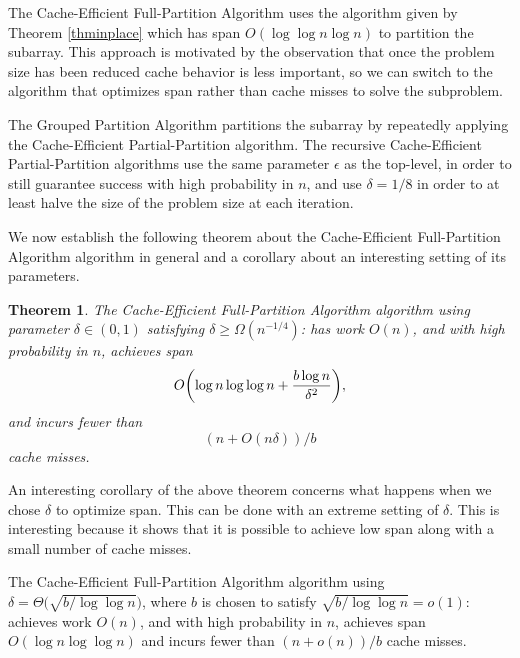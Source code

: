 \documentclass[twocolumn, twoside, 11pt]{article}
\DeclarePairedDelimiter{\paren}{(}{)}
\newtheorem{theorem}{Theorem}
\begin{document}
The Cache-Efficient Full-Partition Algorithm uses the algorithm given by Theorem \ref{thminplace} which has span $O(\log\log n \log n)$ to partition the subarray.
This approach is motivated by the observation that once the problem size has been reduced cache behavior is less important, so we can switch to the algorithm that optimizes span rather than cache misses to solve the subproblem.

The Grouped Partition Algorithm partitions the subarray by repeatedly applying the Cache-Efficient Partial-Partition algorithm. 
The recursive Cache-Efficient Partial-Partition algorithms use the same parameter $\epsilon$ as the top-level, in order to still guarantee success with high probability in $n$, and use $\delta = 1/8$ in order to at least halve the size of the problem size at each iteration. 


We now establish the following theorem about the Cache-Efficient Full-Partition Algorithm algorithm in general and a corollary about an interesting setting of its parameters.
\begin{theorem}
	\label{thm:fullPartition}
	The Cache-Efficient Full-Partition Algorithm algorithm using parameter $\delta\in(0,1)$ satisfying $\delta \ge \Omega(n^{-1/4})$: has work $O(n)$, and with high probability in $n$, achieves span $$O\paren*{\log n \log\log n +\frac{b\log n}{\delta^2}},$$
and incurs fewer than 
$$(n+O(n\delta))/b$$
cache misses.
\end{theorem}

An interesting corollary of the above theorem concerns what happens when we chose $\delta$ to optimize span.
This can be done with an extreme setting of $\delta$.
This is interesting because it shows that it is possible to achieve low span along with a small number of cache misses.
\begin{corollary}
	\label{cor:fullPartition}
	The Cache-Efficient Full-Partition Algorithm algorithm using $\delta = \Theta\big(\sqrt{b/\log\log n}\big)$, where $b$ is chosen to satisfy $\sqrt{b/\log\log n} = o(1)$: achieves work $O(n)$, and with high probability in $n$, achieves span $O(\log n \log\log n)$ and incurs fewer than $(n+o(n))/b$ cache misses.\\\\
\end{corollary}
\end{document}
